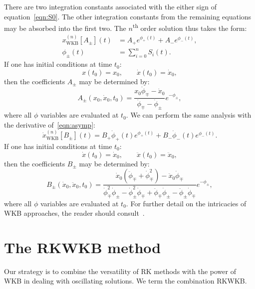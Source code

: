 There are two integration constants associated with the either sign of equation~\eqref{eqn:S0}. The other integration constants from the remaining equations may be absorbed into the first two. The \(n\)\textsuperscript{th} order solution thus takes the form:
\begin{align}       
  x_\mathrm{WKB}^{(n)}[A_{\pm}](t) &=
  A_{+} e^{\phi_+(t)} + A_{-} e^{\phi_-(t)},
  \label{eqn:solution} \\
  \phi_\pm(t) &= \sum_{i=0}^{n} S_i(t).
  \label{eqn:phidef} 
\end{align}
If one has initial conditions at time \(t_0\):
\begin{equation}
  x(t_0) = x_0, \qquad \dot{x}(t_0)=\dot{x}_0,
  \label{eqn:i_c}
\end{equation}
then the coefficients \(A_\pm\) may be determined by:
\begin{equation}
    A_\pm(x_0,\dot{x}_0,t_0) = \frac{x_0 \dot{\phi}_\mp- \dot{x}_0 }{\dot{\phi}_\mp - \dot{\phi}_\pm} e^{-\phi_\pm},
  \label{eqn:i_c_Apm}
\end{equation}
where all \(\phi\) variables are evaluated at \(t_0\).
We can perform the same analysis with the derivative of~\eqref{eqn:asymp}:
\begin{equation}       
  \dot{x}_\mathrm{WKB}^{(n)}[B_{\pm}](t) =
  B_{+} \dot{\phi}_+(t)e^{\phi_+(t)} + B_{-} \dot{\phi}_-(t)e^{\phi_-(t)}.
  \label{eqn:solution_xdot}
\end{equation}
If one has initial conditions at time \(t_0\):
\begin{equation}
  \dot{x}(t_0) = \dot{x}_0, \qquad \ddot{x}(t_0)=\ddot{x}_0,
  \label{eqn:i_c_xdot}
\end{equation}
then the coefficients \(B_\pm\) may be determined by:
\begin{equation}
    B_\pm(\dot{x}_0,\ddot{x}_0,t_0) = \frac{\dot{x}_0(\ddot{\phi}_\mp+\dot{\phi}_\mp^{2})-\ddot{x}_0\dot{\phi}_\mp}{\dot{\phi}_\mp^{2}\dot{\phi}_\pm-\dot{\phi}_\pm^{2}\dot{\phi}_\mp+\ddot{\phi}_\mp\dot{\phi}_\pm-\ddot{\phi}_\pm\dot{\phi}_\mp} {{e}^{-{\phi}_\pm}},
  \label{eqn:i_c_Bpm}
\end{equation}
where all \(\phi\) variables are evaluated at \(t_0\).
For further detail on the intricacies of WKB approaches, the reader should consult~\cite{RHB,Bender+2010}.

\section{The RKWKB method}
Our strategy is to combine the versatility of RK methods with the power of WKB in dealing with oscillating solutions. We term the combination RKWKB\@.

